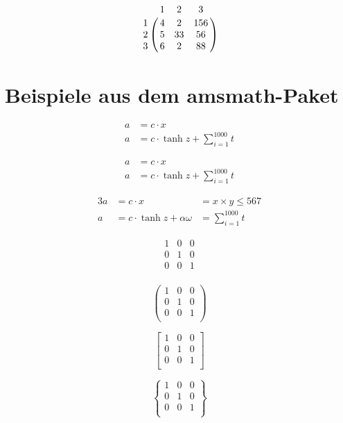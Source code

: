 \documentclass[12pt,ngerman,parskip=half]{scrartcl}
\begin{document}
\[
\bordermatrix{
   & 1 & 2 & 3 \cr
1 & 4 & 2 & 156 \cr
2 & 5 & 33 & 56 \cr
3 & 6 & 2 & 88 \cr
}
\]

\section{Beispiele aus dem amsmath-Paket}

\begin{align}
a &= c \cdot x \\
a &= c \cdot \tanh z + \sum_{i=1}^{1000} t
\end{align}

\begin{align*}
a &= c \cdot x \\
a &= c \cdot \tanh z + \sum_{i=1}^{1000} t
\end{align*}

\begin{alignat}{3}
a &= c \cdot x &= x\times y \leq 567 \\
a &= c \cdot \tanh z + \alpha\omega &= \sum_{i=1}^{1000} t
\end{alignat}


\[%
\begin{matrix} 
1 & 0 & 0 \\ 
0 & 1 & 0 \\ 
0 & 0 & 1 \\ 
\end{matrix}
\]

\[%
\begin{pmatrix} 
1 & 0 & 0 \\ 
0 & 1 & 0 \\ 
0 & 0 & 1 \\ 
\end{pmatrix}
\]

\[%
\begin{bmatrix} 
1 & 0 & 0 \\ 
0 & 1 & 0 \\ 
0 & 0 & 1 \\ 
\end{bmatrix}
\]

\[%
\begin{Bmatrix} 
1 & 0 & 0 \\ 
0 & 1 & 0 \\ 
0 & 0 & 1 \\ 
\end{Bmatrix}
\]
\end{document}
